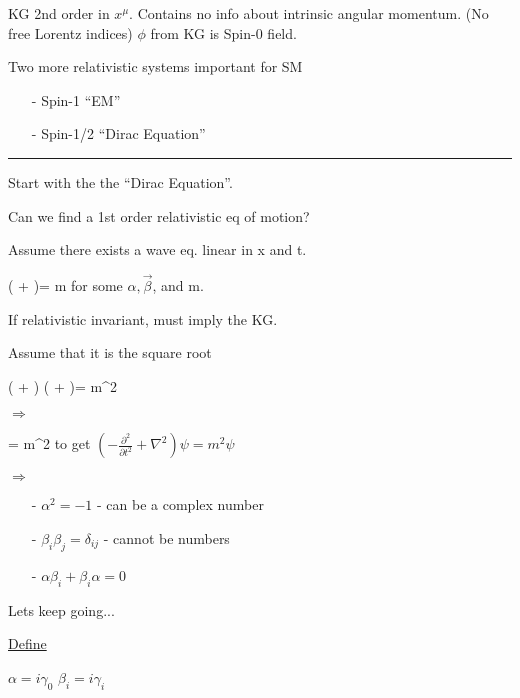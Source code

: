 {KG 2nd order in $x^\mu$.  
Contains no info about intrinsic angular momentum. (No free Lorentz indices)
$\phi$ from KG is Spin-0 field.

\begin{tcolorbox}
Two more relativistic systems important for SM
\begin{itemize}
\item[-] Spin-1 ``EM''
\item[-] Spin-1/2 ``Dirac Equation''
\end{itemize}
\end{tcolorbox}


\noindent\rule{\textwidth}{1pt}
Start with the the ``Dirac Equation''.

Can we find a 1st order relativistic eq of motion?

Assume there exists a wave eq. linear in x and t.

\be
\left(\alpha {} + \vec{\beta}\vec{\nabla}   \right)\psi = m\psi
\ee
for some $\alpha, \vec{\beta}$, and m. 

If relativistic invariant, must imply the KG. 

Assume that it is the square root

\be
\left(\alpha {} + \vec{\beta}\vec{\nabla}   \right) \left(\alpha {} + \vec{\beta}\vec{\nabla}   \right)\psi = m^2\psi
\ee

$\Rightarrow$

\be
{} \psi = m^2 \psi
\ee
to get $(-\frac{\partial^2}{\partial t^2} + \nabla^2)\psi = m^2 \psi$

$\Rightarrow$

\begin{itemize}        
\item[-] $\alpha^2 = -1$ - can be a complex number 
\item[-] $\beta_i\beta_j = \delta_{ij}$ - cannot be numbers
\item[-] $\alpha\beta_i + \beta_i\alpha = 0$
\end{itemize}        

Lets keep going...  

\underline{Define}


$\alpha = i \gamma_0 $ \hspace*{1in} $\beta_i = i \gamma_i $

}
